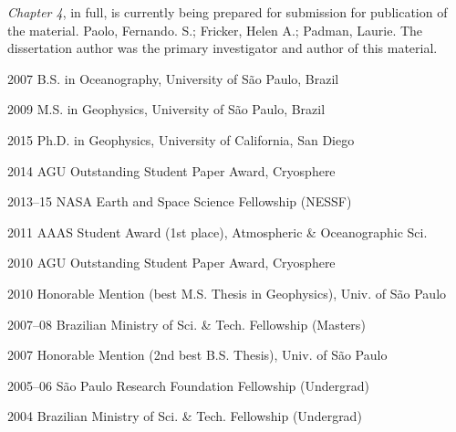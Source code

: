 \begin{frontmatter}
\begin{acknowledgements}
{\sl Chapter 4}, in full, is currently being prepared for submission for publication
of the material. Paolo, Fernando. S.; Fricker, Helen A.; Padman, Laurie. The
dissertation author was the primary investigator and author of this material.
 
\end{acknowledgements}


%
%
\begin{vitapage}

\begin{vita}
  \item[2007] B.S. in Oceanography, University of S\~ao Paulo, Brazil
  \item[2009] M.S. in Geophysics, University of S\~ao Paulo, Brazil
  \item[2015] Ph.D. in Geophysics, University of California, San Diego 
\end{vita}

\begin{awards}
  \item[2014] AGU Outstanding Student Paper Award, Cryosphere
  \item[2013--15] NASA Earth and Space Science Fellowship (NESSF)
  \item[2011] AAAS Student Award (1st place), Atmospheric \& Oceanographic Sci.
  \item[2010] AGU Outstanding Student Paper Award, Cryosphere
  \item[2010] Honorable Mention (best M.S. Thesis in Geophysics), Univ. of S\~ao Paulo
  \item[2007--08] Brazilian Ministry of Sci. \& Tech. Fellowship (Masters)
  \item[2007] Honorable Mention (2nd best B.S. Thesis), Univ. of S\~ao Paulo
  \item[2005--06] S\~ao Paulo Research Foundation Fellowship (Undergrad)
  \item[2004] Brazilian Ministry of Sci. \& Tech. Fellowship (Undergrad)
\end{awards}


\end{vitapage}
\end{frontmatter}

